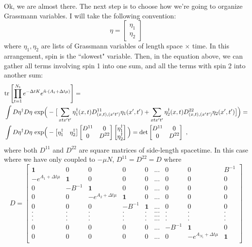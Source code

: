  Ok, we are almost there. The next step is to choose how we're going to organize Grassmann variables. I will take the following convention:
\begin{equation*}
\eta = \begin{bmatrix} \eta_1 \\ \eta_2 \end{bmatrix}
\end{equation*} 
where $\eta_1, \eta_2$ are lists of Grassmann variables of length space $\times$ time. In this arrangement, spin is the ``slowest" variable. Then, in the equation above, we can gather all terms involving spin 1 into one sum, and all the terms with spin 2 into another sum:
\begin{align*}
& \text{tr}\left[\prod_{t=1}^{N_t} e^{-\Delta t K}  e^{ \tilde{n}\cdot (A_t + \Delta t \mu)} \right]  
= \\
& \int{}  D\eta^{\dagger} D\eta ~ \text{exp}\Big(- \big[ \sum_{x t x' t'} \eta_1^{\dagger}(x,t) D^{11}_{(x,t),(x't')} \eta_1(x',t') + \sum_{x t x' t'} \eta_2^{\dagger}(x,t) D^{22}_{(x,t),(x't')} \eta_2(x',t')  \big]  \Big) = \\
& \int{}  D\eta^{\dagger} D\eta~ 
\text{exp}\Big(-
\begin{bmatrix}
\eta_1^{\dagger} & \eta_2^{\dagger}
\end{bmatrix}
\begin{bmatrix}
D^{11} & 0 \\ 
0 & D^{22}
\end{bmatrix}
\begin{bmatrix}
\eta_1^{\dagger} \\ \eta_2^{\dagger}
\end{bmatrix}
 \Big) = \text{det}
 \begin{bmatrix}
D^{11} & 0 \\ 
0 & D^{22}
\end{bmatrix}~,
\end{align*}
where both $D^{11}$ and $D^{22}$ are square matrices of side-length spacetime. In this case where we have only coupled to $-\mu N$, $D^{11} = D^{22} = D$ where
\begin{equation}
D = \begin{bmatrix} 
\mathbf{1} & 0 & 0 & 0 & 0 & ... & 0 & 0 &  B^{-1} \\
-e^{A_1+\Delta t \mu} & \mathbf{1} & 0 & 0 & 0 & ... & 0 & 0 & 0 \\
0 & -B^{-1} & \mathbf{1} & 0 & 0 & ... & 0 & 0 & 0 \\
0 & 0 & -e^{A_2+\Delta t \mu} & \mathbf{1} & 0 & ... & 0 & 0 & 0 \\
0 & 0 & 0 & -B^{-1} & \mathbf{1} & ... & 0 & 0 & 0 \\
. & . & . & . & . & ... & . & . & . \\
. & . & . & . & . & ... & . & . & . \\
. & . & . & . & . & ... & . & . & . \\
0 & 0 & 0 & 0 & 0 & ... &  -B^{-1} & \mathbf{1} & 0 \\
0 & 0 & 0 & 0 & 0 & ... & 0 & -e^{A_{N_t}+\Delta t \mu} & \mathbf{1} \\
\end{bmatrix}
\end{equation}
